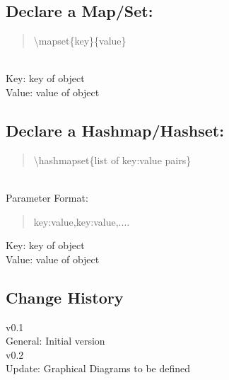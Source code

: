 \documentclass[10pt,a4paper,english]{article}
\begin{document}
\begin{flushleft}
\subsection*{Declare a Map/Set:}
\begin{quote}{\ttfamily \raggedright \noindent
{\textbackslash}mapset{\{}key{\}}{\{}value{\}} 
}\end{quote}
~\\ \medskip
Key:  key of object ~\\
Value: value of object ~\\

\subsection*{Declare a Hashmap/Hashset:}
\begin{quote}{\ttfamily \raggedright \noindent
{\textbackslash}hashmapset{\{}list of key:value pairs{\}}
}\end{quote}
~\\ \medskip
Parameter Format:~\\ \medskip
\begin{quote}{\ttfamily \raggedright \noindent
{ {key:value},{key:value},....}
}\end{quote}
Key:  key of object ~\\
Value: value of object ~\\

\end{flushleft}

\newpage
\begin{multicols}{2} %

\section*{Change History}
v0.1\\
\indent General: Initial version  \\ 
v0.2\\
\indent Update: Graphical Diagrams to be defined 
\end{multicols}
\end{document}
